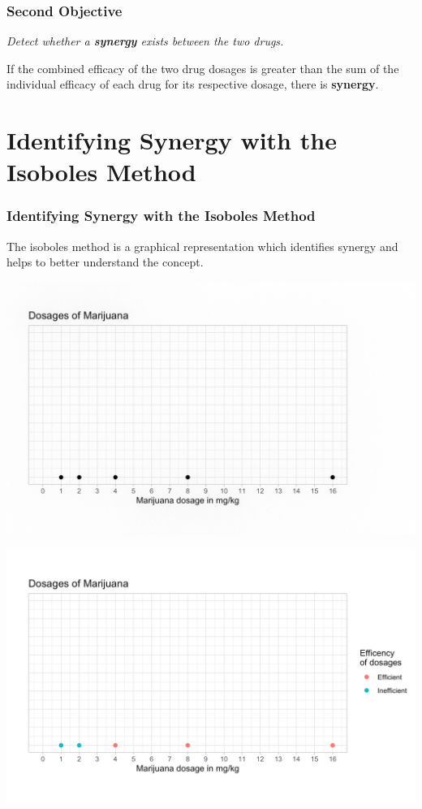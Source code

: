 \documentclass[14pt]{beamer}
\begin{document}
\begin{frame}
\frametitle{Second Objective}
\textit{Detect whether a \textbf{synergy} exists between the two drugs.}

\bigskip

If the combined efficacy of the two drug dosages is greater than the sum of the individual efficacy of each drug for its respective dosage, there is \textbf{synergy}.
\end{frame}


\section{Identifying Synergy with the Isoboles Method}
\begin{frame}
\frametitle{Identifying Synergy with the Isoboles Method}
The isoboles method is a graphical representation which identifies synergy and helps to better understand the concept.
\end{frame}

\begin{frame}
\begin{center}
\includegraphics[scale=0.23]{img1.png}
\end{center}
\end{frame}

\begin{frame}
\begin{center}
\includegraphics[scale=0.23]{img2.png}
\end{center}
\end{frame}
\end{document}
